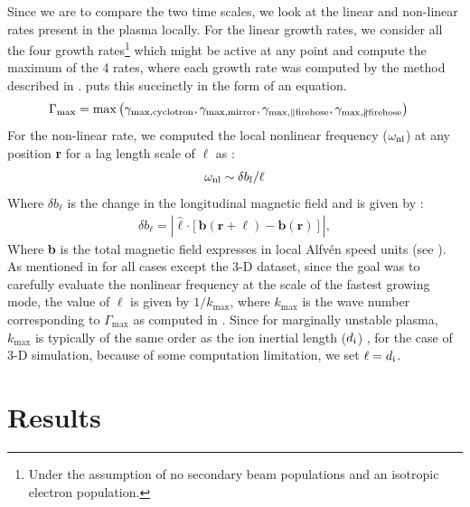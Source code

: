         Since we are to compare the two time scales, we look at the linear and non-linear rates
        present in the plasma locally. For the linear growth rates, we consider all the four growth
        rates\footnote{Under the assumption of no secondary beam populations and an isotropic
        electron population.} which might be active at any point and compute the maximum of the 4
        rates, where each growth rate was computed by the method described in
        .  puts this succinctly in the form of an
        equation.
        \begin{align}
            \Gamma_{\max} & = \max\left( \gamma_{\rm \max, cyclotron}, \gamma_{\rm \max, mirror}, \gamma_{\rm \max, \parallel firehose}, \gamma_{\rm \max, \nparallel firehose} \right) \label{eq:lin_max_gamma}
        \end{align}
        For the non-linear rate, we computed the local nonlinear frequency ($\omega_{\rm nl}$) at
        any position \textbf{r} for a lag length scale of $\ell$ as :
        \begin{align}
            \omega_{\rm nl} \sim \delta b_l/\ell \label{eq:nln_time}
        \end{align}
        Where $\delta b_\ell$ is the change in the longitudinal magnetic field and is given by :
        \begin{align}
            \delta b_{\ell} = \left \lvert\hat{\boldsymbol{\ell}} \mathbf{\cdot} \left[\mathbf{b} (\mathbf{r} + \boldsymbol{\ell}) - \mathbf{b} (\mathbf{r})\right]\right\lvert \label{eq:db2},
        \end{align}
        Where \textbf{b} is the total magnetic field expresses in local Alfv\'en speed units (see
        ). As mentioned in  for all cases except the 3-D dataset,
        since the goal was to carefully evaluate the nonlinear frequency at the scale of the fastest
        growing mode, the value of $\ell$ is given by $1/k_{\max}$, where $k_{\max}$ is the wave
        number corresponding to $\Gamma_{\max}$ as computed in . Since for
        marginally unstable plasma, $k_{\max}$ is typically of the same order as the ion inertial
        length ($d_{\rm i}$) \citep[Figures 6.6 to 6.9]{Maruca2012a}, for the case of 3-D
        simulation, because of some computation limitation, we set $\ell = d_{\rm i}$.

    \section{Results} \label{sec:diss7}


